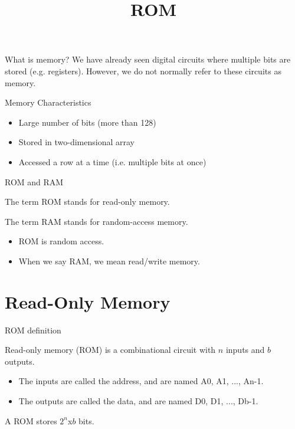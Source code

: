 \title{ROM}


\begin{frame}{What is memory?}
  We have already seen digital circuits where multiple bits are stored (e.g. registers).  However, we do not normally refer to these circuits as memory.
  \begin{block}{Memory Characteristics}
    \begin{itemize}
      \item Large number of bits (more than 128)
      \item Stored in two-dimensional array
      \item Accessed a row at a time (i.e. multiple bits at once)
    \end{itemize}
  \end{block}
\end{frame}

\begin{frame}{ROM and RAM}
  \begin{definition}
    The term \alert{ROM} stands for read-only memory.
  \end{definition}
  \begin{definition}
    The term \alert{RAM} stands for random-access memory.
  \end{definition}
  \begin{itemize}
    \item ROM is random access.
    \item When we say RAM, we mean read/write memory.
  \end{itemize}
\end{frame}

\section{Read-Only Memory}

\begin{frame}{ROM definition}
  \begin{definition}
    \alert{Read-only memory (ROM)} is a combinational circuit with $n$ inputs and $b$ outputs.
  \end{definition}
  \begin{itemize}
    \item The inputs are called the address, and are named A0, A1, ..., An-1.
    \item The outputs are called the data, and are named D0, D1, ..., Db-1.
  \end{itemize}
  A ROM stores $2^n$x$b$ bits.
\end{frame}

